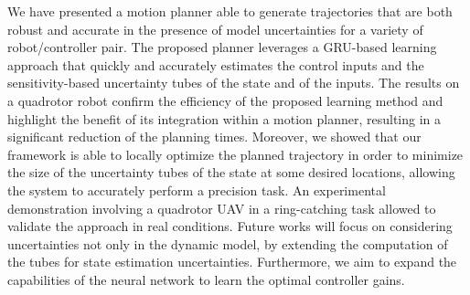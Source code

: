 We have presented a motion planner able to generate trajectories that are both robust and accurate in the presence of model uncertainties for a variety of robot/controller pair. The proposed planner leverages a GRU-based learning approach that quickly and accurately estimates the control inputs and the sensitivity-based uncertainty tubes of the state and of the inputs. 
The results on a quadrotor robot confirm the efficiency of the proposed learning method and highlight the benefit of its integration within a motion planner, resulting in a significant reduction of the planning times. 
Moreover, we showed that our framework is able to locally optimize the planned trajectory in order to minimize the size of the uncertainty tubes of the state at some desired locations, allowing the system to accurately perform a precision task. An experimental demonstration involving a quadrotor UAV in a ring-catching task allowed to validate the approach in real conditions. Future works will focus on considering uncertainties not only in the dynamic model, by extending the computation of the tubes for state estimation uncertainties. 
Furthermore, we aim to expand the capabilities of the neural network to learn the optimal controller gains.


\todomarker{}